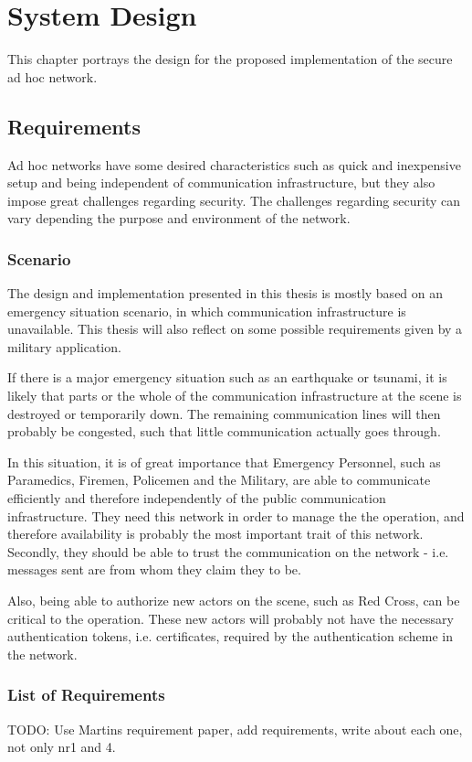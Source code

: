 \chapter{System Design}
\acresetall

This chapter portrays the design for the proposed implementation of the secure
ad hoc network.

\section{Requirements}
Ad hoc networks have some desired characteristics such as quick and inexpensive
setup and being independent of communication infrastructure, but they
also impose great challenges regarding security. The challenges
regarding security can vary depending the purpose and environment of the
network.

\subsection{Scenario}
The design and implementation presented in this thesis is mostly based on an
emergency situation scenario, in which communication infrastructure is
unavailable. This thesis will also reflect on some possible requirements given
by a military application.

If there is a major emergency situation such as an earthquake or tsunami, it is
likely that parts or the whole of the communication infrastructure at the scene
is destroyed or temporarily down. The remaining communication lines will then
probably be congested, such that little communication actually goes through.

In this situation, it is of great importance that Emergency Personnel, such as
Paramedics, Firemen, Policemen and the Military, are able to communicate
efficiently and therefore independently of the public communication
infrastructure. They need this network in order to manage the the operation, and
therefore availability is probably the most important trait of this network.
Secondly, they should be able to trust the communication on the network - i.e.
messages sent are from whom they claim they to be.

Also, being able to authorize new actors on the scene, such as Red Cross, can be
critical to the operation. These new actors will probably not have the necessary
authentication tokens, i.e. certificates, required by the authentication scheme
in the network.

\subsection{List of Requirements}
TODO: Use Martins requirement paper, add requirements, write about each one, not
only nr1 and 4.

